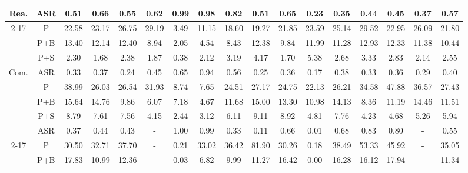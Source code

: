 \begin{table*}[t]
{\begin{tabular}{c|c|cccccccccccccc|c}
\multicolumn{1}{c|}{\multirow{5}{*}{ Rea.}}             &  ASR              &0.51  & 0.66  & 0.55  & 0.62  & 0.99 & 0.98  & 0.82  & 0.51   & 0.65  & 0.23   & 0.35  & 0.44  & 0.45&0.37 &0.57  \\
\cline{2-17}
\multicolumn{1}{c|}{}                                              &  P           &22.58 & 23.17 & 26.75 & 29.19 & 3.49 & 11.15 & 18.60 & 19.27  & 21.85 & 23.59  & 25.14 & 29.52 & 22.95&26.09 &21.80\\
\multicolumn{1}{c|}{}                                              &  P+B &13.40 & 12.14 & 12.40 & 8.94  & 2.05 & 4.54  & 8.43  & 12.38  & 9.84  & 11.99  & 11.28 & 12.93 & 12.33&11.38 &10.44 \\
\multicolumn{1}{c|}{}                                              &  P+S  &2.30  & 1.68  & 2.38  & 1.87  & 0.38 & 2.12  & 3.19  & 4.17   & 1.70  & 5.38   & 2.68  & 3.33  & 2.83&2.14  &2.55\\ \hline
\multicolumn{1}{c|}{\multirow{5}{*}{ Com.}}           &  ASR              &0.33  & 0.37  & 0.24  & 0.45  & 0.65 & 0.94  & 0.56  & 0.25   & 0.36  & 0.17   & 0.38  & 0.33  & 0.36&0.29 &0.40 \\
\cline{2-17}
\multicolumn{1}{c|}{}                                              &  P           &38.99 & 26.03 & 26.54 & 31.93 & 8.74 & 7.65  & 24.51 & 27.17  & 24.75 & 22.13  & 26.21 & 34.58 & 47.88&36.57 & 27.43\\
\multicolumn{1}{c|}{}                                              &  P+B &15.64 & 14.76 & 9.86  & 6.07  & 7.18 & 4.67  & 11.68 & 15.00  & 13.30 & 10.98  & 14.13 & 8.36  & 11.19 & 14.46 &11.51 \\
\multicolumn{1}{c|}{}                                              &  P+S  &8.79  & 7.61  & 7.56  & 4.15  & 2.44 & 3.12  & 6.11  & 9.11   & 8.92  & 4.81   & 7.76  & 4.23  & 4.68 & 5.26 &5.94\\ \hline
\multicolumn{1}{c|}{\multirow{5}{*}{ Hal.}}         &  ASR              &0.37  & 0.44  & 0.43  & -  & 1.00 & 0.99  & 0.33  & 0.11   & 0.66  & 0.01 & 0.68  & 0.83  & 0.80 & - &0.55 \\
\cline{2-17}
\multicolumn{1}{c|}{}                                              &  P           & 30.50 & 32.71 & 37.70 & -     & 0.21 & 33.02 & 36.42 & 81.90  & 30.26 & 0.18    & 38.49 & 53.33 & 45.92&-&35.05\\
\multicolumn{1}{c|}{}                                              &  P+B &17.83 & 10.99 & 12.36 & -     & 0.03 & 6.82  & 9.99  & 11.27  & 16.42 & 0.00     & 16.28 & 16.12 & 17.94 &-&11.34\\

\end{tabular}}
\end{table*}
